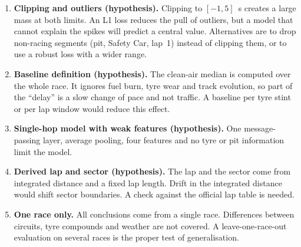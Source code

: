 \documentclass[11pt,a4paper]{article}
\begin{document}
\begin{enumerate}[leftmargin=*]
        the test partition. The 100\% version will add safety-car lap
        flagging. The size of the effect should be measured by recomputing
        the metrics with these laps removed.
  \item \textbf{Clipping and outliers (hypothesis).} Clipping to
        $[-1,5]$~s creates a large mass at both limits. An L1 loss reduces
        the pull of outliers, but a model that cannot explain the spikes
        will predict a central value. Alternatives are to drop non-racing
        segments (pit, Safety Car, lap~1) instead of clipping them, or to use
        a robust loss with a wider range.
  \item \textbf{Baseline definition (hypothesis).} The clean-air median is
        computed over the whole race. It ignores fuel burn, tyre wear and
        track evolution, so part of the ``delay'' is a slow change of pace
        and not traffic. A baseline per tyre stint or per lap window would
        reduce this effect.
  \item \textbf{Single-hop model with weak features (hypothesis).} One
        message-passing layer, average pooling, four features and no tyre or
        pit information limit the model.
  \item \textbf{Derived lap and sector (hypothesis).} The lap and the
        sector come from integrated distance and a fixed lap length. Drift
        in the integrated distance would shift sector boundaries. A check
        against the official lap table is needed.
  \item \textbf{One race only.} All conclusions come from a single race.
        Differences between circuits, tyre compounds and weather are not
        covered. A leave-one-race-out evaluation on several races is the
        proper test of generalisation.
\end{enumerate}
\end{document}
